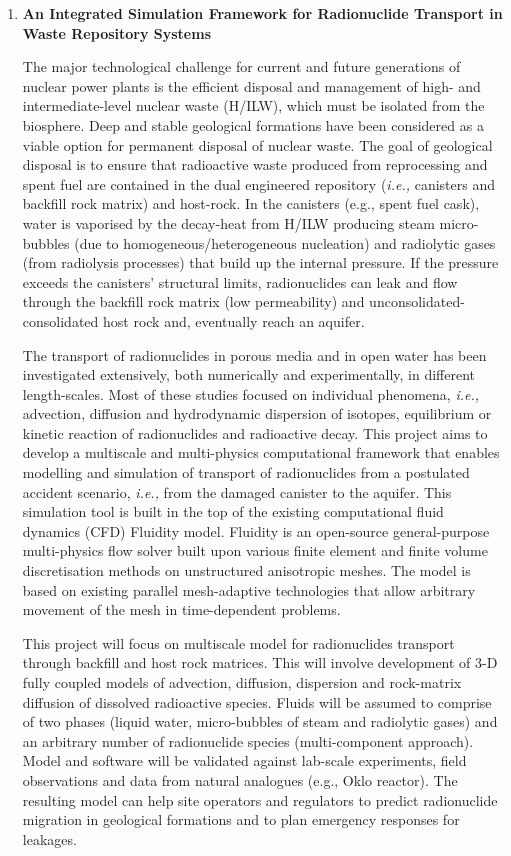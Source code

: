 \documentclass[12pts,a4paper,amsmath,amssymb,floatfix]{article}%
\newcommand{\ie}{{\it i.e., }}
\begin{document}
\begin{enumerate}[label=\bfseries Project: \arabic*:]

\item {\bf An Integrated Simulation Framework for Radionuclide Transport in Waste Repository Systems}


The major technological challenge for current and future generations of nuclear power plants is the efficient disposal and management of high- and intermediate-level nuclear waste (H/ILW), which must be isolated from the biosphere. Deep and stable geological formations have been considered as a viable option for permanent disposal of nuclear waste. The goal of geological disposal is to ensure that radioactive waste produced from reprocessing and spent fuel are contained in the dual engineered repository (\ie canisters and backfill rock matrix) and host-rock. In the canisters (e.g., spent fuel cask), water is vaporised by the decay-heat from H/ILW producing steam micro-bubbles (due to homogeneous/heterogeneous nucleation) and radiolytic gases (from radiolysis processes) that build up the internal pressure. If the pressure exceeds the canisters' structural limits, radionuclides can leak and flow through the backfill rock matrix (low permeability) and unconsolidated-consolidated host rock and, eventually reach an aquifer.

The transport of radionuclides in porous media and in open water has been investigated extensively, both numerically and experimentally, in different length-scales. Most of these studies focused on individual phenomena, \ie advection, diffusion and hydrodynamic dispersion of isotopes, equilibrium or kinetic reaction of radionuclides and radioactive decay. This project aims to develop a multiscale and multi-physics computational framework that enables modelling and simulation of transport of radionuclides from a postulated accident scenario, \ie from the damaged canister to the aquifer. This simulation tool is built in the top of the existing computational fluid dynamics (CFD) Fluidity model.  Fluidity is an open-source general-purpose multi-physics flow solver built upon various finite element and finite volume discretisation methods on unstructured anisotropic meshes. The model is based on existing parallel mesh-adaptive technologies that allow arbitrary movement of the mesh in time-dependent problems.

This project will focus on multiscale model for radionuclides transport through backfill and host rock matrices. This will involve development of 3-D fully coupled models of advection, diffusion, dispersion and rock-matrix diffusion of dissolved radioactive species. Fluids will be assumed to comprise of two phases (liquid water, micro-bubbles of steam and radiolytic gases) and an arbitrary number of radionuclide species (multi-component approach). Model and software will be validated against lab-scale experiments, field observations and data from natural analogues (e.g., Oklo reactor).  The resulting model can help site operators and regulators to predict radionuclide migration in geological formations and to plan emergency responses for leakages.


\end{enumerate}
\end{document}
